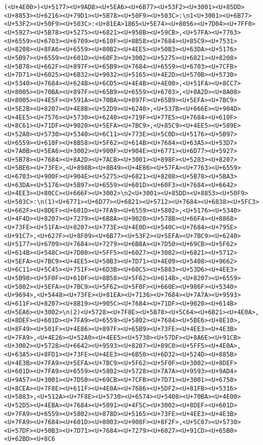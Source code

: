 \documentclass[
]{article}
\begin{document}
\begin{verbatim}
(<U+4E00>)<U+5177><U+9AD8><U+5EA6><U+6B77><U+53F2><U+3001><U+85DD><U+8853><U+6216><U+79D1><U+5B78><U+50F9><U+503C>:\n1<U+3001><U+6B77><U+53F2><U+50F9><U+503C>:<U+81EA>1865<U+5E74><U+8056><U+7D04><U+7FF0><U+5927><U+5B78><U+5275><U+6821><U+958B><U+59CB>,<U+57FA><U+7763><U+6559><U+6703><U+6709><U+610F><U+8B58><U+7684><U+85C9><U+7531><U+8208><U+8FA6><U+6559><U+80B2><U+4EE5><U+50B3><U+63DA><U+5176><U+5B97><U+6559><U+601D><U+60F3><U+3002><U+5275><U+6821><U+8208><U+5B78><U+662F><U+897F><U+65B9><U+7684><U+6559><U+6703><U+7CFB><U+7D71><U+6025><U+6B32><U+9032><U+5165><U+4E2D><U+570B><U+5730><U+5340><U+7684><U+624B><U+6CD5><U+4E4B><U+4E00>,<U+51FA><U+8CC7><U+8005><U+70BA><U+897F><U+65B9><U+6559><U+6703>,<U+8A2D><U+8A08><U+8005><U+4E5F><U+591A><U+70BA><U+897F><U+65B9><U+5EFA><U+7BC9><U+5E2B><U+8207><U+4E8B><U+52D9><U+6240>,<U+537B><U+666E><U+904D><U+4EE5><U+7576><U+5730><U+6240><U+719F><U+77E5><U+7684><U+610F><U+8C61><U+71DF><U+9020><U+5EFA><U+7BC9>,<U+85C9><U+4EE5><U+589E><U+52A0><U+5730><U+5340><U+6C11><U+773E><U+5C0D><U+5176><U+5B97><U+6559><U+610F><U+8B58><U+5F62><U+614B><U+7684><U+63A5><U+53D7><U+7A0B><U+5EA6><U+3002><U+900F><U+904E><U+6771><U+6D77><U+5927><U+5B78><U+7684><U+8A2D><U+7ACB><U+3001><U+898F><U+5283><U+8207><U+5BE6><U+73FE>,<U+898B><U+8B49><U+4E86><U+57FA><U+7763><U+6559><U+6703><U+900F><U+904E><U+5275><U+6821><U+8208><U+5B78><U+5BA3><U+63DA><U+5176><U+5B97><U+6559><U+601D><U+60F3><U+7684><U+6642><U+4EE3><U+80CC><U+666F><U+3002>\n2<U+3001><U+85DD><U+8853><U+50F9><U+503C>:\n(1)<U+6771><U+6D77><U+6821><U+5712><U+7684><U+6838><U+5FC3><U+662F><U+8DEF><U+601D><U+7FA9><U+6559><U+5802>,<U+5176><U+5340><U+4F4D><U+8207><U+7279><U+6B8A><U+9020><U+578B><U+66F4><U+8868><U+73FE><U+51FA><U+8207><U+773E><U+4E0D><U+540C><U+7684><U+795E><U+91C7>,<U+627F><U+8F09><U+6B77><U+53F2><U+5EFA><U+7BC9><U+6240><U+5177><U+6709><U+7684><U+7279><U+6B8A><U+7D50><U+69CB><U+5F62><U+614B><U+548C><U+7D00><U+5FF5><U+6027><U+3002><U+6821><U+5712><U+5EFA><U+7BC9><U+4EE5><U+50B3><U+7D71><U+4E09><U+5408><U+9662><U+6C11><U+5C45><U+751F><U+6D3B><U+60C5><U+5883><U+53D6><U+4EE3><U+5B98><U+5F0F><U+610F><U+8B58><U+5F62><U+614B>,<U+8207><U+6559><U+5802><U+5EFA><U+7BC9><U+5F62><U+5F0F><U+660E><U+986F><U+5340><U+9694>,<U+5448><U+73FE><U+81EA><U+7136><U+7684><U+7A7A><U+9593><U+611F><U+8207><U+8B19><U+905C><U+7684><U+71DF><U+9020><U+614B><U+5EA6><U+3002>\n(2)<U+5728><U+7F8E><U+5B78><U+5C64><U+6B21><U+4E0A>,<U+8DEF><U+601D><U+7FA9><U+6559><U+5802><U+7684><U+5BE6><U+8E10>,<U+8F49><U+501F><U+4E86><U+897F><U+65B9><U+73FE><U+4EE3><U+4E3B><U+7FA9>,<U+4E26><U+52A0><U+4EE5><U+5730><U+57DF><U+8A6E><U+91CB><U+3002><U+5728><U+6642><U+9593><U+8207><U+89C0><U+5FF5><U+4E0A>,<U+63A5><U+8FD1><U+73FE><U+4EE3><U+6B50><U+6D32><U+524D><U+885B><U+4E3B><U+7FA9><U+5EFA><U+7BC9><U+5F62><U+5F0F><U+3002><U+8DEF><U+601D><U+7FA9><U+6559><U+5802><U+5728><U+7A7A><U+9593><U+9AD4><U+9A57><U+3001><U+7D50><U+69CB><U+7CFB><U+7D71><U+3001><U+6750><U+8CEA><U+7F8E><U+611F><U+4E0A><U+7686><U+5DF2><U+81FB><U+5316><U+5883>,<U+512A><U+7F8E><U+5730><U+6574><U+5408><U+70BA><U+4E00><U+52D5><U+4EBA><U+7684><U+5091><U+4F5C><U+3002><U+8DEF><U+601D><U+7FA9><U+6559><U+5802><U+878D><U+5165><U+73FE><U+4EE3><U+4E3B><U+7FA9><U+7684><U+601D><U+8003><U+908F><U+8F2F>,<U+5C07><U+5730><U+57DF><U+50B3><U+7D71><U+7684><U+7279><U+6027><U+91CD><U+65B0><U+62BD><U+8C6
\end{verbatim}
\end{document}
